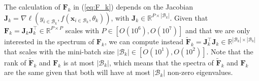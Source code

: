 \documentclass[10pt,journal,compsoc]{IEEEtran}
\begin{document}
The calculation of $\mathbf{F}_k$ in (\ref{eq:F_k}) depends on the Jacobian $\mathbf{J}_k = \nabla \ell(y_{i \in \mathcal{B}_k},f(\mathbf{x}_{i \in \mathcal{B}_k},\theta_k))$, with $\mathbf{J}_k  \in \mathbb R^{P \times |\mathcal{B}_k|}$.  Given that $\mathbf{F}_k = \mathbf{J}_k \mathbf{J}_k^{\top} \in \mathbb R^{P \times P}$ scales with $P \in [O(10^6),O(10^7)]$ and that we are only interested in the spectrum of $\mathbf{F}_k$, we can compute instead $\widetilde{\mathbf{F}}_k = \mathbf{J}_k^{\top} \mathbf{J}_k \in \mathbb R^{|\mathcal{B}_k| \times |\mathcal{B}_k|}$ that scales with the mini-batch size $|\mathcal{B}_k| \in [O(10^1),O(10^2)]$.  
Note that the rank of $\widetilde{\mathbf{F}}_k$ and $\mathbf{F}_k$ is at most $|\mathcal{B}_k|$, which means that the spectra of $\widetilde{\mathbf{F}}_k$ and $\mathbf{F}_k$ are the same given that both will have at most $|\mathcal{B}_k|$ non-zero eigenvalues.%



\end{document}
